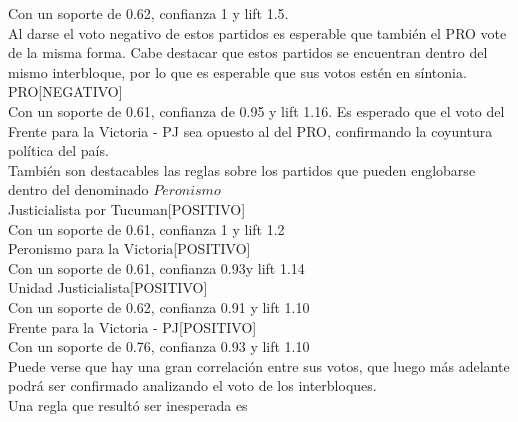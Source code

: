 \documentclass{endm}
\begin{document}
Con un soporte de 0.62, confianza 1 y lift 1.5.\\

Al darse el voto negativo de estos partidos es esperable que también el PRO vote de la misma forma. Cabe destacar que estos partidos se encuentran dentro del mismo interbloque, por lo que es esperable que sus votos estén en síntonia. \\

{PRO[NEGATIVO]}   \\

Con un soporte de 0.61, confianza de  0.95 y lift 1.16. Es esperado que el voto del Frente para la Victoria - PJ sea opuesto al del PRO, confirmando la coyuntura política del país. \\ 

También son destacables las reglas sobre los partidos que pueden englobarse dentro del denominado $Peronismo$ \\

{Justicialista por Tucuman[POSITIVO]}  \\

Con un soporte de  0.61, confianza 1 y lift 1.2\\


{Peronismo para la Victoria[POSITIVO]}   \\

Con un soporte de 0.61, confianza 0.93y lift 1.14\\

{Unidad Justicialista[POSITIVO]}   \\

Con un soporte de 0.62, confianza 0.91 y lift 1.10\\

{Frente para la Victoria - PJ[POSITIVO]}    \\

Con un soporte de 0.76, confianza 0.93 y lift 1.10\\

Puede verse que hay una gran correlación entre sus votos, que luego más adelante podrá ser confirmado analizando el voto de los interbloques.\\

Una regla que resultó ser inesperada es \\
\end{document}
